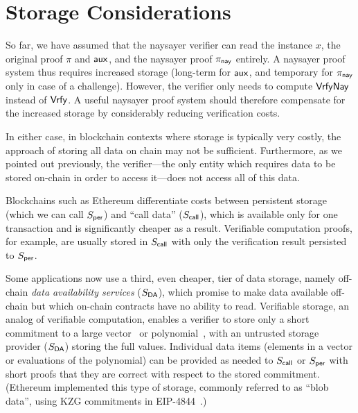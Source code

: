 \section{Storage Considerations}\label{sec:naysayer_storage}

So far, we have assumed that the naysayer verifier can read the instance $x$, the original proof $\pi$ and $\mathsf{aux}$, and the naysayer proof $\pi_{\mathsf{nay}}$ entirely. A naysayer proof system thus requires increased storage (long-term for $\mathsf{aux}$, and temporary for $\pi_{\mathsf{nay}}$ only in case of a challenge). However, the verifier only needs to compute ${\mathsf{Vrfy}}\mathsf{Nay}$ instead of $\mathsf{Vrfy}$. A useful naysayer proof system should therefore compensate for the increased storage by considerably reducing verification costs.

In either case, in blockchain contexts where storage is typically very costly, the approach of storing all data on chain may not be sufficient. Furthermore, as we pointed out previously, the verifier---the only entity which requires data to be stored on-chain in order to access it---does not access all of this data.

Blockchains such as Ethereum differentiate costs between persistent storage (which we can call $S_{\sf per}$) and ``call data'' ($S_{\sf call}$), which is available only for one transaction and is significantly cheaper as a result. Verifiable computation proofs, for example, are usually stored in $S_{\sf call}$ with only the verification result persisted to $S_{\sf per}$.

Some applications now use a third, even cheaper, tier of data storage, namely off-chain \emph{data availability services} ($S_{\sf DA}$), which promise to make data available off-chain but which on-chain contracts have no ability to read. Verifiable storage, an analog of verifiable computation, enables a verifier to store only a short commitment to a large vector~\cite{PKC:CatFio13,C:Merkle87} or polynomial~\cite{AC:KatZavGol10}, with an untrusted storage provider ($S_{\sf DA}$) storing the full values. Individual data items (elements in a vector or evaluations of the polynomial) can be provided as needed to $S_{\sf call}$ or $S_{\sf per}$ with short proofs that they are correct with respect to the stored commitment.  (Ethereum implemented this type of storage, commonly referred to as ``blob data'', using KZG commitments in EIP-4844~\cite{eip4844}.)

